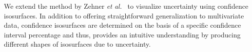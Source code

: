 %
%
 We extend the method by Zehner \textit{et al.}~\cite{zehner2010visualization} to visualize uncertainty using confidence isosurfaces. 
%
In addition to offering straightforward generalization to multivariate data, confidence isosurfaces are determined on the basis of a specific confidence interval percentage and thus, provides an intuitive understanding by producing different shapes of isosurfaces due to uncertainty. 
%
%
